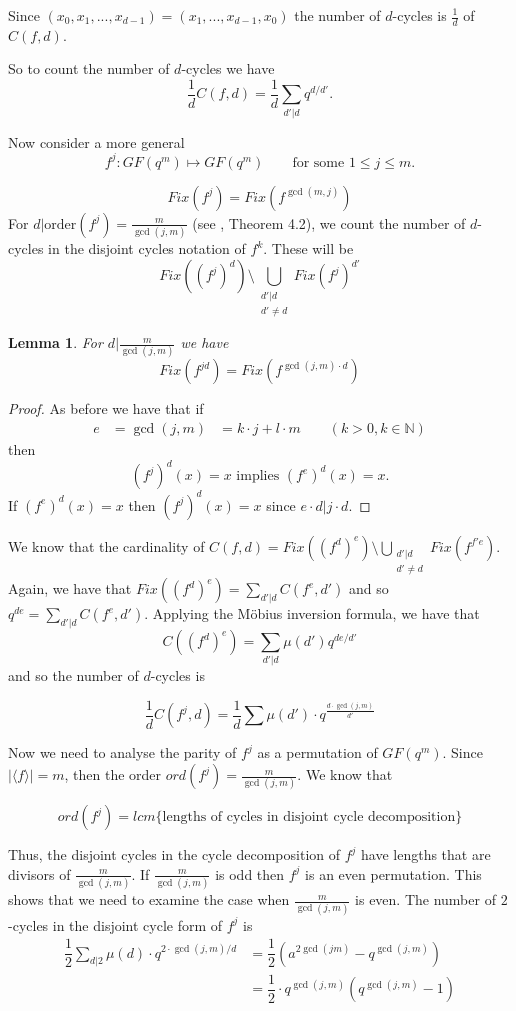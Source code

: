 \documentclass[11pt]{amsart}
\newtheorem{lemma}[theorem]{{\bf Lemma }}
\begin{document}
Since $(x_0, x_1,..., x_{d-1}) =  (x_1,..., x_{d-1}, x_0)$ the number of $d$-cycles is $\frac{1}{d}$ of $C(f,d)$.

So to count the number of $d$-cycles we have 
$$ \frac{1}{d} C(f,d) = \frac{1}{d}\sum_{d'|d}q^{d/d'}.$$

Now consider a more general
$$ f^j: GF(q^m) \mapsto GF(q^m) \quad \quad \mbox{for some } 1 \leqslant j \leqslant m.$$

$$ Fix(f^j) = Fix(f^{\gcd(m,j)})$$
For $\displaystyle{ d | \mbox{order}(f^j) = \frac{m}{\gcd(j,m)}}$ (see \cite{G}, Theorem 4.2), we count the number of $d$-cycles in the disjoint cycles notation of $f^k$.  These will be 
$$ Fix((f^j)^d)\setminus \bigcup_{\substack{d'|d\\d'\neq d}} Fix(f^j)^{d'}$$

\begin{lemma}
For $\displaystyle{d|\frac{m}{\gcd(j,m)}}$ we have 
$$ Fix(f^{jd}) = Fix(f^{\gcd(j,m)\cdot d})$$
\end{lemma}

\begin{proof}
As before we have that if 
\begin{align*}
e&=\gcd(j,m)
&= k\cdot j + l\cdot m \quad \quad (k> 0, k\in \mathbb{N})
\end{align*}
then $$ (f^j)^d(x) = x \mbox{ implies } (f^e)^d (x)=x.$$
If $(f^e)^d(x)=x$ then $(f^j)^d(x) = x$ since $e\cdot d | j\cdot d$.
\end{proof}

We know that the cardinality of $ C(f,d)=Fix((f^d)^e)\setminus\bigcup_{\substack{d'|d\\d'\neq d}} Fix (f^{f'e})$. Again, we have that $ Fix ((f^d)^e) = \sum_{d'|d} C(f^e, d')$ and so $ q^{de} = \sum_{d'|d} C(f^e, d')$. Applying the M\"{o}bius inversion formula,  we have that
$$ C((f^d)^e) = \sum_{d'|d} \mu(d')q^{de/d'}$$
and so the number of $d$-cycles is

$$\frac{1}{d}C(f^j, d) = \frac{1}{d} \sum \mu(d') \cdot q^{\frac{d\cdot \gcd(j,m)}{d'}}$$
\mbox{}

Now we need to analyse the parity of $f^j$ as a permutation of $GF(q^m)$. Since $|\langle f\rangle| = m$, then the order $ord(f^j)= \frac{m}{\gcd(j,m)}$. We know that 

$$ ord(f^j) = lcm\lbrace \mbox{lengths of cycles in disjoint cycle decomposition}\rbrace$$

Thus, the disjoint cycles in the cycle decomposition of $\displaystyle{ f^j}$ have lengths that are divisors of $\displaystyle{\frac{m}{\gcd(j,m)}}$.  If $\displaystyle \frac{m}{\gcd(j,m)}$ is odd then $f^j$ is an even permutation. This shows that we need to examine the case when $\displaystyle{\frac{m}{\gcd(j,m)}}$ is even. The number of $2$-cycles in the disjoint cycle form of $f^j$ is
\begin{align}
\dfrac{1}{2}\sum_{d|2} \mu(d) \cdot q^{2\cdot \gcd(j,m)/d}&= \dfrac{1}{2} \left( a^{2\gcd(jm)}-q^{\gcd(j,m)}\right)\\
&= \dfrac{1}{2} \cdot q^{\gcd(j,m)}\left( q^{\gcd(j,m)} -1\right)\nonumber
\end{align}
\end{document}
